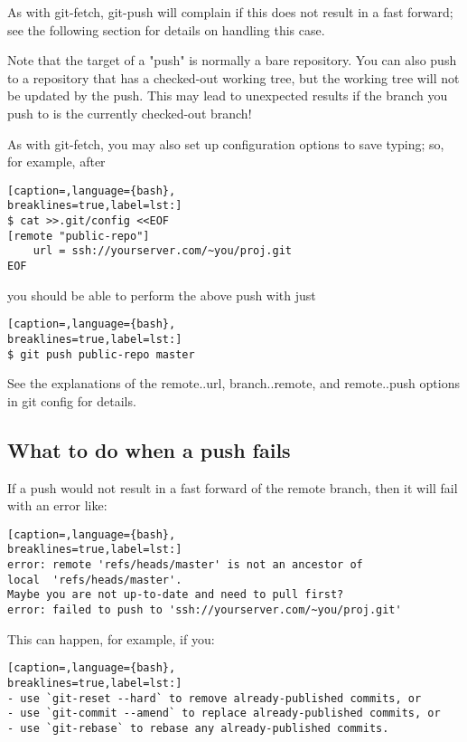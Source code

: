 As with git-fetch, git-push will complain if this does not result in a fast
forward; see the following section for details on handling this case.

Note that the target of a "push" is normally a bare repository. You can also
push to a repository that has a checked-out working tree, but the working tree
will not be updated by the push. This may lead to unexpected results if the
branch you push to is the currently checked-out branch!

As with git-fetch, you may also set up configuration options to save typing;
so, for example, after
\lstset{basicstyle=\scriptsize, numbers=none, captionpos=b, tabsize=4}
\begin{lstlisting}[caption=,language={bash},
breaklines=true,label=lst:]
$ cat >>.git/config <<EOF
[remote "public-repo"]
    url = ssh://yourserver.com/~you/proj.git
EOF
\end{lstlisting}

you should be able to perform the above push with just
\lstset{basicstyle=\scriptsize, numbers=none, captionpos=b, tabsize=4}
\begin{lstlisting}[caption=,language={bash},
breaklines=true,label=lst:]
$ git push public-repo master
\end{lstlisting}

See the explanations of the remote..url, branch..remote, and remote..push
options in git config for details.

\subsection{What to do when a push fails}
If a push would not result in a fast forward of the remote branch, then it will
fail with an error like:
\lstset{basicstyle=\scriptsize, numbers=none, captionpos=b, tabsize=4}
\begin{lstlisting}[caption=,language={bash},
breaklines=true,label=lst:]
error: remote 'refs/heads/master' is not an ancestor of
local  'refs/heads/master'.
Maybe you are not up-to-date and need to pull first?
error: failed to push to 'ssh://yourserver.com/~you/proj.git'
\end{lstlisting}

This can happen, for example, if you:
\lstset{basicstyle=\scriptsize, numbers=none, captionpos=b, tabsize=4}
\begin{lstlisting}[caption=,language={bash},
breaklines=true,label=lst:]
- use `git-reset --hard` to remove already-published commits, or
- use `git-commit --amend` to replace already-published commits, or
- use `git-rebase` to rebase any already-published commits.
\end{lstlisting}

